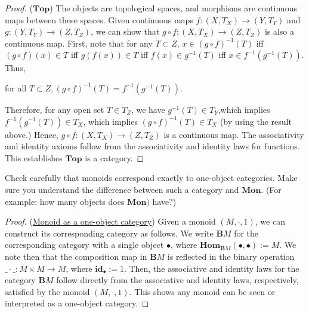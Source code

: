 \documentclass[]{amsbook}
\newcommand{\catname}[1]{\mathbf{#1}}
\begin{document}
\begin{proof}
    ($\catname{Top}$) The objects are topological spaces, and morphisms are
    continuous maps between these spaces. Given continuous maps $f: (X, T_X)
    \to (Y, T_Y)$ and $g: (Y, T_Y) \to (Z, T_Z)$, we can show that $g \circ f:
    (X, T_X) \to (Z, T_Z)$ is also a continuous map. First, note that for any
    $T \subset Z$, $x \in (g \circ f)^{-1}(T)$ iff $(g \circ f)(x) \in T$ iff
    $g(f(x)) \in T$ iff $f(x) \in g^{-1}(T)$ iff $x \in f^{-1}(g^{-1}(T))$.
    Thus,
    \begin{center}
	    for all $T \subset Z, (g \circ f)^{-1}(T) = f^{-1}(g^{-1}(T))$.
    \end{center}
	Therefore, for any open set $T \in T_Z$, we have $g^{-1}(T) \in T_Y$,which
	implies	$f^{-1}(g^{-1}(T)) \in T_X$, which implies $(g \circ f)^{-1}(T)
	\in T_X$ (by using the result above.) Hence, $g \circ f: (X, T_X) \to
	(Z, T_Z)$ is a continuous map. The associativity and identity axioms follow
	from the associativity and identity laws for functions. This establishes
	$\catname{Top}$ is a category.
\end{proof}

\begin{Exercise}
    Check carefully that monoids correspond exactly to one-object categories.
    Make sure you understand the difference between such a category and
    $\catname{Mon}$. (For example: how many objects does $\catname{Mon})$
    have?)
\end{Exercise}
\begin{proof}
    (\href{https://ncatlab.org/nlab/show/monoid#as_a_oneobject_category}
    {Monoid as a one-object category}) Given a monoid $(M, \cdot, 1)$,
    we can construct its corresponding category as follows. We write
    $\catname{B}M$ for the corresponding category with a single object
    $\bullet$, where $\catname{Hom}_{\catname{B}M}(\bullet, \bullet) := M$.
    We note then that the composition map in $\catname{B}M$ is reflected in
    the binary operation $\_ \cdot \_ : M \times M \to M$, where
    $\mathbf{id}_{\bullet} := 1$. Then, the associative and identity laws for
    the category $\catname{B}M$ follow directly from the associative and
    identity laws, respectively, satisfied by the monoid $(M, \cdot, 1)$.
    This shows any monoid can be seen or interpreted as a one-object category.
\end{proof}
\end{document}
